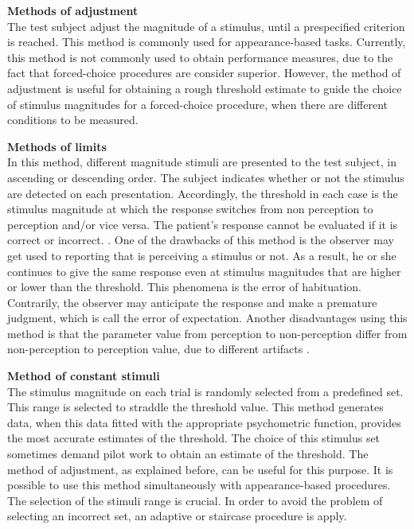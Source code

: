 
\textbf{Methods of adjustment}
\\
The test subject adjust the magnitude of a stimulus, until a prespecified criterion is reached. This method is commonly used for appearance-based tasks. Currently, this method is not commonly used to obtain performance measures, due to the fact that forced-choice procedures are consider superior. However, the method of adjustment is useful for obtaining a rough threshold estimate to guide the choice of stimulus magnitudes for a forced-choice procedure, when there are different conditions to be measured.

\textbf{Methods of limits} 
\\
In this method, different magnitude stimuli are presented to the test subject, in ascending or descending order. The subject indicates whether or not the stimulus are detected on each presentation. Accordingly, the threshold in each case is the stimulus magnitude at which the response switches from non perception to perception and/or vice versa. The patient's response cannot be evaluated if it is correct or incorrect. \cite{Kingdom2016}. One of the drawbacks of this method  is the observer may get used to reporting that is perceiving a stimulus or not. As a result, he or she  continues to give the same response even at stimulus magnitudes that are higher or lower than the threshold. This phenomena is the error of habituation. Contrarily, the observer may anticipate the response and make a premature judgment, which is call the error of expectation. Another disadvantages using this method is that the parameter value from perception to non-perception differ from non-perception to perception value, due to different artifacts \cite{Hock2010}.

\textbf{Method of constant stimuli}
\\
The stimulus magnitude on each trial is randomly selected from a predefined set. This range is selected to straddle the threshold value. This method generates data, when this data fitted with the appropriate psychometric function, provides the most accurate estimates of the threshold. The choice of this stimulus set sometimes demand pilot work to obtain an estimate of the threshold. The method of adjustment, as explained before, can be useful for this purpose. It is possible to use this method simultaneously with appearance-based procedures. The selection of the stimuli range is crucial. In order to avoid the problem of selecting an incorrect set, an adaptive or staircase procedure is apply.

